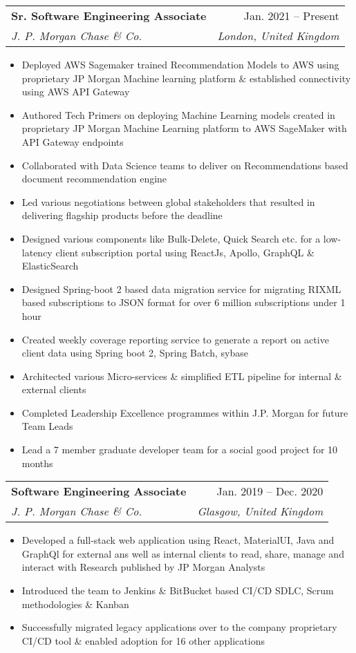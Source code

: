 \documentclass[letterpaper,11pt]{article}
\makeatletter
\newcommand{\resumeItem}[1]{
  \item\small{
    {#1 \vspace{-2pt}}
  }
}
\newcommand{\resumeSubheading}[4]{
  \vspace{-2pt}\item
    \begin{tabular*}{0.97\textwidth}[t]{l@{\extracolsep{\fill}}r}
      \textbf{#1} & #2 \\
      \textit{\small#3} & \textit{\small #4} \\
    \end{tabular*}\vspace{-7pt}
}
\newcommand{\resumeSubSubheading}[2]{
    \item
    \begin{tabular*}{0.97\textwidth}{l@{\extracolsep{\fill}}r}
      \textit{\small#1} & \textit{\small #2} \\
    \end{tabular*}\vspace{-7pt}
}
\newcommand{\resumeSubHeadingListEnd}{\end{itemize}}
\newcommand{\resumeItemListStart}{\begin{itemize}}
\newcommand{\resumeItemListEnd}{\end{itemize}\vspace{-5pt}}
\makeatother
\begin{document}
\resumeSubheading
{Sr. Software Engineering Associate}{ Jan. 2021 – Present}
{J. P. Morgan Chase \& Co.}{London, United Kingdom}
\resumeItemListStart
\resumeItem{Deployed AWS Sagemaker trained Recommendation Models to AWS using proprietary JP Morgan Machine learning platform \& established connectivity using AWS API Gateway}
\resumeItem{Authored Tech Primers on deploying Machine Learning models created in proprietary JP Morgan Machine Learning platform to AWS SageMaker with API Gateway endpoints}
\resumeItem{Collaborated with Data Science teams to deliver on Recommendations based document recommendation engine }
\resumeItem{Led various negotiations between global stakeholders that resulted in delivering flagship products before the deadline}
\resumeItem{Designed various components like Bulk-Delete, Quick Search etc. for a low-latency client subscription portal using ReactJs, Apollo, GraphQL \& ElasticSearch}
\resumeItem{Designed Spring-boot 2 based data migration service for migrating RIXML based subscriptions to JSON format for over 6 million subscriptions under 1 hour}
\resumeItem{Created weekly coverage reporting service to generate a report on active client data using Spring boot 2, Spring Batch, sybase}
\resumeItem{Architected various Micro-services \& simplified ETL pipeline for internal \& external clients}
\resumeItem{Completed Leadership Excellence programmes within J.P. Morgan for future Team Leads}
\resumeItem{Lead a 7 member graduate developer team for a social good project for 10 months}
\resumeItemListEnd
\resumeSubheading
{Software Engineering Associate}{Jan. 2019 -- Dec. 2020}
{J. P. Morgan Chase \& Co.}{Glasgow, United Kingdom}
\resumeItemListStart
\resumeItem{Developed a full-stack web application using React, MaterialUI, Java and GraphQl for external ans well as internal clients to read, share, manage and interact with Research published by JP Morgan Analysts}
\resumeItem{Introduced the team to Jenkins \& BitBucket based CI/CD SDLC, Scrum methodologies \& Kanban}
\resumeItem{Successfully migrated legacy applications over to the company proprietary CI/CD tool \&
	enabled adoption for 16 other applications}
\resumeItemListEnd

\end{document}

